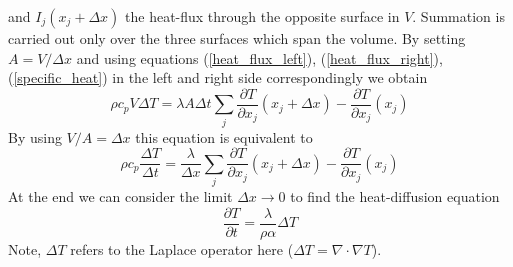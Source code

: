 \documentclass[]{article}
\begin{document}
and $I_{j}(x_j+\Delta x)$ the heat-flux through the opposite surface in $V$. Summation is carried out only over the three surfaces which span the volume.
By setting $A=V/\Delta x$ and using equations (\ref{heat_flux_left}), (\ref{heat_flux_right}), (\ref{specific_heat}) in the left and right side correspondingly we obtain
\begin{equation*}
\rho c_p V\Delta T = \lambda A\Delta t\sum_{j}\frac{\partial T}{\partial x_j}(x_j+\Delta x)-\frac{\partial T}{\partial x_j}(x_j)
\end{equation*}
By using $V/A=\Delta x$ this equation is equivalent to
\begin{equation*}
\rho c_p \frac{\Delta T}{\Delta t} = \frac{\lambda}{\Delta x}\sum_{j}\frac{\partial T}{\partial x_j}(x_j+\Delta x)-\frac{\partial T}{\partial x_j}(x_j)
\end{equation*}
At the end we can consider the limit $\Delta x\rightarrow 0$ to find the heat-diffusion equation
\begin{equation}
\frac{\partial T}{\partial t}=\frac{\lambda}{\rho\alpha}\Delta T
\end{equation}
Note, $\Delta T$ refers to the Laplace operator here ($\Delta T=\nabla\cdot\nabla T$).
\end{document}
